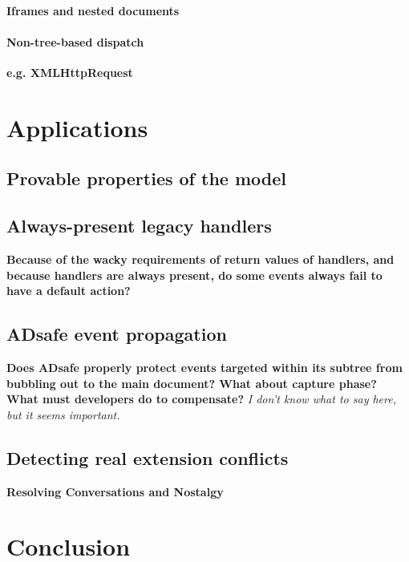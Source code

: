 \documentclass[letterpaper,10pt,twocolumn]{article}
\let\theendnotes\relax
\begin{document}
\paragraph{Iframes and nested documents} \lipsum[8]
\paragraph{Non-tree-based dispatch} \textbf{e.g. XMLHttpRequest}
\lipsum[9]

\section{Applications}
\subsection{Provable properties of the model}
\lipsum[1-8]
\subsection{Always-present legacy handlers} \textbf{Because of the
  wacky requirements of return values of handlers, and because
  handlers are always present, do some events always fail to have a
  default action?}
\lipsum[1-3]

\subsection{ADsafe event propagation} \textbf{Does ADsafe properly
  protect events targeted within its subtree from bubbling out to the
  main document?  What about capture phase?  What must developers do
  to compensate?} \emph{I don't know what to say here, but it seems
  important.}
\lipsum[4-6]

\subsection{Detecting real extension conflicts} \textbf{Resolving Conversations
  and Nostalgy}
\lipsum[7-9]

\section{Conclusion}\label{sec:conclusion}
\lipsum[1]

%
%

%
%

{\footnotesize 

\lipsum[1-3]}

\theendnotes
\end{document}
